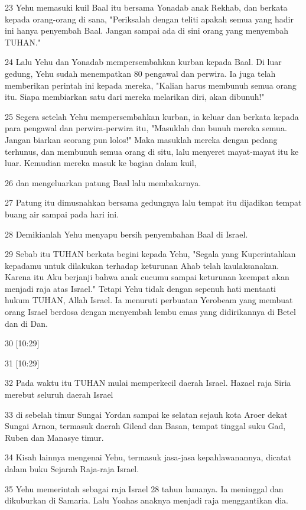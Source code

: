 \par 23 Yehu memasuki kuil Baal itu bersama Yonadab anak Rekhab, dan berkata kepada orang-orang di sana, "Periksalah dengan teliti apakah semua yang hadir ini hanya penyembah Baal. Jangan sampai ada di sini orang yang menyembah TUHAN."
\par 24 Lalu Yehu dan Yonadab mempersembahkan kurban kepada Baal. Di luar gedung, Yehu sudah menempatkan 80 pengawal dan perwira. Ia juga telah memberikan perintah ini kepada mereka, "Kalian harus membunuh semua orang itu. Siapa membiarkan satu dari mereka melarikan diri, akan dibunuh!"
\par 25 Segera setelah Yehu mempersembahkan kurban, ia keluar dan berkata kepada para pengawal dan perwira-perwira itu, "Masuklah dan bunuh mereka semua. Jangan biarkan seorang pun lolos!" Maka masuklah mereka dengan pedang terhunus, dan membunuh semua orang di situ, lalu menyeret mayat-mayat itu ke luar. Kemudian mereka masuk ke bagian dalam kuil,
\par 26 dan mengeluarkan patung Baal lalu membakarnya.
\par 27 Patung itu dimusnahkan bersama gedungnya lalu tempat itu dijadikan tempat buang air sampai pada hari ini.
\par 28 Demikianlah Yehu menyapu bersih penyembahan Baal di Israel.
\par 29 Sebab itu TUHAN berkata begini kepada Yehu, "Segala yang Kuperintahkan kepadamu untuk dilakukan terhadap keturunan Ahab telah kaulaksanakan. Karena itu Aku berjanji bahwa anak cucumu sampai keturunan keempat akan menjadi raja atas Israel." Tetapi Yehu tidak dengan sepenuh hati mentaati hukum TUHAN, Allah Israel. Ia menuruti perbuatan Yerobeam yang membuat orang Israel berdosa dengan menyembah lembu emas yang didirikannya di Betel dan di Dan.
\par 30 [10:29]
\par 31 [10:29]
\par 32 Pada waktu itu TUHAN mulai memperkecil daerah Israel. Hazael raja Siria merebut seluruh daerah Israel
\par 33 di sebelah timur Sungai Yordan sampai ke selatan sejauh kota Aroer dekat Sungai Arnon, termasuk daerah Gilead dan Basan, tempat tinggal suku Gad, Ruben dan Manasye timur.
\par 34 Kisah lainnya mengenai Yehu, termasuk jasa-jasa kepahlawanannya, dicatat dalam buku Sejarah Raja-raja Israel.
\par 35 Yehu memerintah sebagai raja Israel 28 tahun lamanya. Ia meninggal dan dikuburkan di Samaria. Lalu Yoahas anaknya menjadi raja menggantikan dia.

